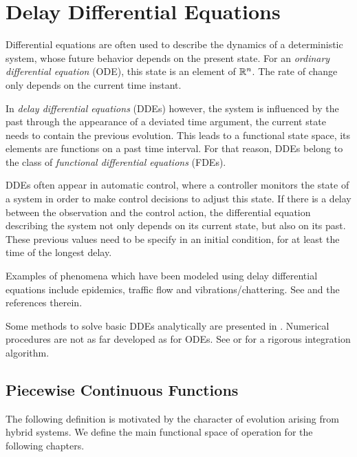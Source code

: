 \chapter{Delay Differential Equations}

Differential equations are often used to describe the dynamics of a deterministic system, whose future behavior depends on the present state.
For an \emph{ordinary differential equation} (ODE), this state is an element of $\mathbb{R}^n$. The rate of change only depends on the current time instant.

In \emph{delay differential equations} (DDEs) however, the system is influenced by the past through the appearance of a deviated time argument, the current state needs to contain the previous evolution.
This leads to a functional state space, its elements are functions on a past time interval.
For that reason, DDEs belong to the class of \emph{functional differential equations} (FDEs).

DDEs often appear in automatic control, where a controller monitors the state of a system in order to make control decisions to adjust this state.
If there is a delay between the observation and the control action, the differential equation describing the system not only depends on its current state, but also on its past.
These previous values need to be specify in an initial condition, for at least the time of the longest delay.


Examples of phenomena which have been modeled using delay differential equations include epidemics, traffic flow and vibrations/chattering. See \cite{Falbo06FDEs} and the references therein.

Some methods to solve basic DDEs analytically are presented in \cite{Falbo06FDEs}. Numerical procedures are not as far developed as for ODEs. 
See \cite{Bellen13NumericalDDEs} or \cite{Szczlina14RigorousDDEs} for a rigorous integration algorithm.

\section{Piecewise Continuous Functions}
    \label{sec:piecewise-continuous-functions}
    
    The following definition is motivated by the character of evolution arising from hybrid systems. We define the main functional space of operation for the following chapters.

